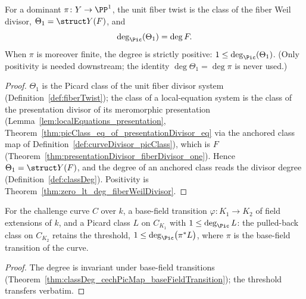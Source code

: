 \begin{theorem}
  \label{thm:classDeg_fiberTwist_one}
  \leanok
  For a dominant \(\pi \colon Y \to \PP^1\), the unit fiber twist is the class of the fiber
  Weil divisor, \(\Theta_1 = \struct Y(F)\), and
  \[
    \deg_{\Pic}(\Theta_1) = \deg F .
  \]
  When \(\pi\) is moreover finite, the degree is strictly positive:
  \(1 \le \deg_{\Pic}(\Theta_1)\). (Only positivity is needed downstream; the identity
  \(\deg \Theta_1 = \deg \pi\) is never used.)
\end{theorem}
\begin{proof}
  \leanok
  \(\Theta_1\) is the Picard class of the unit fiber divisor system
  (Definition~\ref{def:fiberTwist}); the class of a local-equation system is the class of
  the presentation divisor of its meromorphic presentation
  (Lemma~\ref{lem:localEquations_presentation},
  Theorem~\ref{thm:picClass_eq_of_presentationDivisor_eq} via the anchored class map of
  Definition~\ref{def:curveDivisor_picClass}), which is \(F\)
  (Theorem~\ref{thm:presentationDivisor_fiberDivisor_one}). Hence
  \(\Theta_1 = \struct Y(F)\), and the degree of an anchored class reads the divisor degree
  (Definition~\ref{def:classDeg}). Positivity is
  Theorem~\ref{thm:zero_lt_deg_fiberWeilDivisor}.
\end{proof}

\begin{theorem}
  \label{thm:one_le_classDeg_baseFieldTransition}
  \leanok
  For the challenge curve \(C\) over \(k\), a base-field transition
  \(\varphi \colon K_1 \to K_2\) of field extensions of \(k\), and a Picard class \(L\) on
  \(C_{K_1}\) with \(1 \le \deg_{\Pic} L\): the pulled-back class on \(C_{K_2}\) retains the
  threshold, \(1 \le \deg_{\Pic}\bigl(\pi^{*}L\bigr)\), where \(\pi\) is the base-field
  transition of the curve.
\end{theorem}
\begin{proof}
  \leanok
  The degree is invariant under base-field transitions
  (Theorem~\ref{thm:classDeg_cechPicMap_baseFieldTransition}); the threshold transfers
  verbatim.
\end{proof}

